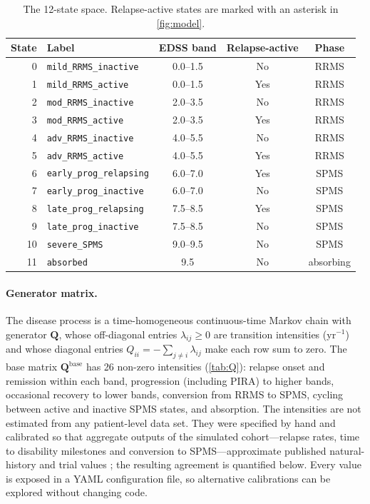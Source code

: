 \documentclass[11pt,a4paper]{article}
\newcommand{\Q}{\mathbf{Q}}
\begin{document}
\begin{table}[htbp]
\centering
\caption{The 12-state space. Relapse-active states are marked with an asterisk in \cref{fig:model}.}
\label{tab:states}
\small
\begin{tabular}{rlccc}
\toprule
\textbf{State} & \textbf{Label} & \textbf{EDSS band} & \textbf{Relapse-active} & \textbf{Phase}\\
\midrule
0 & \texttt{mild\_RRMS\_inactive} & 0.0--1.5 & No & RRMS \\
1 & \texttt{mild\_RRMS\_active} & 0.0--1.5 & Yes & RRMS \\
2 & \texttt{mod\_RRMS\_inactive} & 2.0--3.5 & No & RRMS \\
3 & \texttt{mod\_RRMS\_active} & 2.0--3.5 & Yes & RRMS \\
4 & \texttt{adv\_RRMS\_inactive} & 4.0--5.5 & No & RRMS \\
5 & \texttt{adv\_RRMS\_active} & 4.0--5.5 & Yes & RRMS \\
6 & \texttt{early\_prog\_relapsing} & 6.0--7.0 & Yes & SPMS \\
7 & \texttt{early\_prog\_inactive} & 6.0--7.0 & No & SPMS \\
8 & \texttt{late\_prog\_relapsing} & 7.5--8.5 & Yes & SPMS \\
9 & \texttt{late\_prog\_inactive} & 7.5--8.5 & No & SPMS \\
10 & \texttt{severe\_SPMS} & 9.0--9.5 & No & SPMS \\
11 & \texttt{absorbed} & 9.5 & No & absorbing \\
\bottomrule
\end{tabular}
\end{table}

\paragraph{Generator matrix.}
The disease process is a time-homogeneous continuous-time Markov chain with generator $\Q$, whose off-diagonal entries $\lambda_{ij}\geq 0$ are transition intensities (yr$^{-1}$) and whose diagonal entries $Q_{ii}=-\sum_{j\neq i}\lambda_{ij}$ make each row sum to zero. The base matrix $\Q^{\mathrm{base}}$ has 26 non-zero intensities (\cref{tab:Q}): relapse onset and remission within each band, progression (including PIRA) to higher bands, occasional recovery to lower bands, conversion from RRMS to SPMS, cycling between active and inactive SPMS states, and absorption. The intensities are not estimated from any patient-level data set. They were specified by hand and calibrated so that aggregate outputs of the simulated cohort---relapse rates, time to disability milestones and conversion to SPMS---approximate published natural-history and trial values \cite{weinshenker1989,scalfari2010,confavreux2006,tremlett2006,koch2010,leray2010,polman2006}; the resulting agreement is quantified below. Every value is exposed in a YAML configuration file, so alternative calibrations can be explored without changing code.
\end{document}
